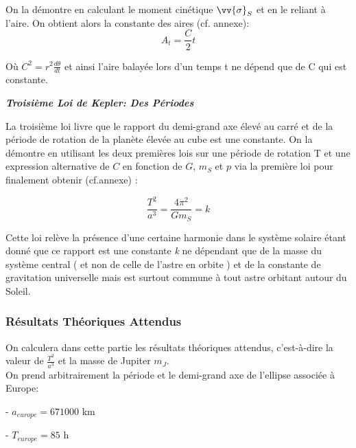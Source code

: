 \documentclass{aa}
\begin{document}
On la démontre en calculant le moment cinétique $\vv{\sigma}_S$ et en le reliant à l'aire. On obtient alors la constante des aires (cf. annexe): 
\begin{equation}
    A_t = \frac{C}{2}t 
\end{equation}

Où $C^2 = r^2\frac{d\theta}{dt}$ et ainsi l'aire balayée lors d'un temps t ne dépend que de C qui est constante.

\begin{flushleft}
\textit{\textbf{Troisième Loi de Kepler: Des Périodes}} \\    
\end{flushleft}

La troisième loi livre que le rapport du demi-grand axe élevé au carré et de la période de rotation de la planète élevée au cube est une constante. On la démontre en utilisant les deux premières lois sur une période de rotation T et une expression alternative de $C$ en fonction de $G$, $m_S$ et $p$ via la première loi pour finalement obtenir (cf.annexe) :

\begin{equation}
    \frac{T^2}{a^3} = \frac{4 \pi ^2}{Gm_S} = k
\end{equation}

Cette loi relève la présence d'une certaine harmonie dans le système solaire étant donné que ce rapport est une constante \emph{k} ne dépendant que de la masse du système central ( et non de celle de l'astre en orbite ) et de la constante de gravitation universelle mais est surtout commune à tout astre orbitant autour du Soleil.

\subsubsection{Résultats Théoriques Attendus}

On calculera dans cette partie les résultats théoriques attendus, c'est-à-dire la valeur de $\frac{T^2}{a^3}$ et la masse de Jupiter $m_J$. \\

On prend arbitrairement la période et le demi-grand axe de l'ellipse associée à Europe:\\

\item - $a_{europe} = 671 000$ km \\
\item - $T_{europe} = 85$ h \\
\end{document}
